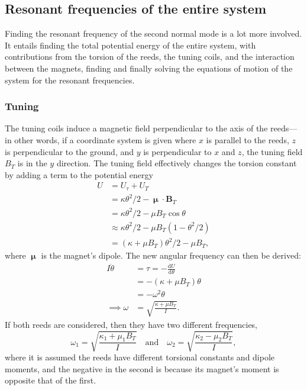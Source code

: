 \documentclass{article}
\begin{document}
\subsection{Resonant frequencies of the entire system}
Finding the resonant frequency of the second normal mode is a lot more involved. It entails finding the total potential energy of the entire system, with contributions from the torsion of the reeds, the tuning coils, and the interaction between the magnets, finding and finally solving the equations of motion of the system for the resonant frequencies.
\subsubsection{Tuning}
The tuning coils induce a magnetic field perpendicular to the axis of the reeds---in other words, if a coordinate system is given where $x$ is parallel to the reeds, $z$ is perpendicular to the ground, and $y$ is perpendicular to $x$ and $z$, the tuning field $B_T$ is in the $y$ direction. The tuning field effectively changes the torsion constant by adding a term to the potential energy
\begin{equation*}
    \begin{aligned}
        U   &= U_\tau + U_T \\
            &= \kappa\theta^2/2 - \bm{\upmu}\cdot\mathbf{B}_T \\
            &= \kappa\theta^2/2 - \mu B_T \cos \theta \\
            &\approx \kappa\theta^2/2 - \mu B_T (1-\theta^2/2) \\
            &= (\kappa+\mu B_T)\theta^2/2 - \mu B_T,
    \end{aligned}
\end{equation*}
where $\bm{\upmu}$ is the magnet's dipole. The new angular frequency can then be derived:
\begin{equation*}
    \begin{aligned}
        I \ddot{\theta} &= \tau = -\frac{\mathrm{d}U}{\mathrm{d}\theta} \\
            &= -(\kappa + \mu B_T)\theta \\
            &= -\omega^2 \theta \\
           \implies \omega &=  \sqrt{\frac{\kappa + \mu B_T}{I}}.
    \end{aligned}
\end{equation*}
If both reeds are considered, then they have two different frequencies,
\begin{equation*}
    \omega_1 = \sqrt{\frac{\kappa_1 + \mu_1 B_T}{I}}\quad\text{and}\quad\omega_2 = \sqrt{\frac{\kappa_2 - \mu_2 B_T}{I}},
\end{equation*}
where it is assumed the reeds have different torsional constants and dipole moments, and the negative in the second is because its magnet's moment is opposite that of the first.
\end{document}
